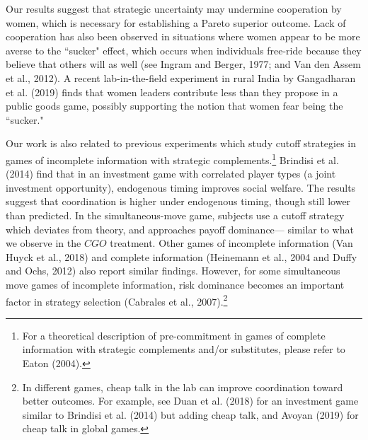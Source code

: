 \documentclass[11pt, letterpaper]{article}
\theoremstyle{plain}
\begin{document}
Our results suggest that strategic uncertainty may undermine cooperation by women, which is necessary for establishing a Pareto superior outcome. Lack of cooperation has also been observed in situations where women appear to be more averse to the ``sucker" effect, which occurs when individuals free-ride because they believe that others will as well (see Ingram and Berger, 1977; and Van den Assem et al., 2012). A recent lab-in-the-field experiment in rural India by Gangadharan et al. (2019) finds that women leaders contribute less than they propose in a public goods game, possibly supporting the notion that women fear being the ``sucker." 

Our work is also related to previous experiments which study cutoff strategies in games of incomplete information with strategic complements.\footnote{For a theoretical description of pre-commitment in games of complete information with strategic complements and/or substitutes, please refer to Eaton (2004).} Brindisi et al. (2014) find that in an investment game with correlated player types (a joint investment opportunity), endogenous timing improves social welfare. The results suggest that coordination is higher under endogenous timing, though still lower than predicted. In the simultaneous-move game, subjects use a cutoff strategy which deviates from theory, and approaches payoff dominance--- similar to what we observe in the $CGO$ treatment. Other games of incomplete information (Van Huyck et al., 2018) and complete information (Heinemann et al., 2004 and Duffy and Ochs, 2012) also report similar findings. However, for some simultaneous move games of incomplete information, risk dominance becomes an important factor in strategy selection (Cabrales et al., 2007).\footnote{In different games, cheap talk in the lab can improve coordination toward better outcomes. For example, see Duan et al. (2018) for an investment game similar to Brindisi et al. (2014) but adding cheap talk, and Avoyan (2019) for cheap talk in global games.}
\end{document}
